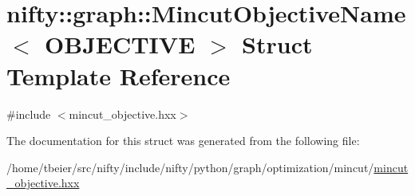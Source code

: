 \hypertarget{structnifty_1_1graph_1_1MincutObjectiveName}{}\section{nifty\+:\+:graph\+:\+:Mincut\+Objective\+Name$<$ O\+B\+J\+E\+C\+T\+I\+V\+E $>$ Struct Template Reference}
\label{structnifty_1_1graph_1_1MincutObjectiveName}


{\ttfamily \#include $<$mincut\+\_\+objective.\+hxx$>$}



The documentation for this struct was generated from the following file\+:\begin{DoxyCompactItemize}
\item 
/home/tbeier/src/nifty/include/nifty/python/graph/optimization/mincut/\hyperlink{python_2graph_2optimization_2mincut_2mincut__objective_8hxx}{mincut\+\_\+objective.\+hxx}\end{DoxyCompactItemize}
